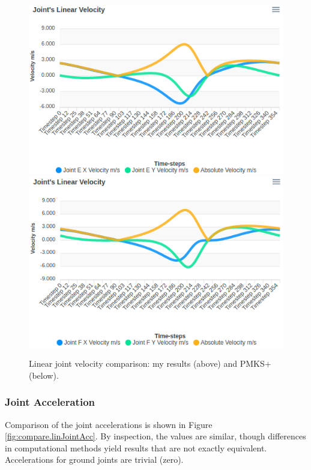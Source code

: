 \documentclass[12pt]{article}
\begin{document}
\begin{figure}[ht]
  \includegraphics[scale=0.45]{../pmks-plots/linJointVel/linJointVelE.png}%
  \includegraphics[scale=0.45]{../pmks-plots/linJointVel/linJointVelF.png}%
  \caption{\label{fig:compare.linJointVel}Linear joint velocity comparison: my results (above) and PMKS+ (below).}
\end{figure}

\subsubsection{Joint Acceleration}%
\label{res.compare.linJointAcc}

Comparison of the joint accelerations is shown in Figure \ref{fig:compare.linJointAcc}. By inspection, the values are similar, though differences in computational methods yield results that are not exactly equivalent. Accelerations for ground joints are trivial (zero).
\end{document}

